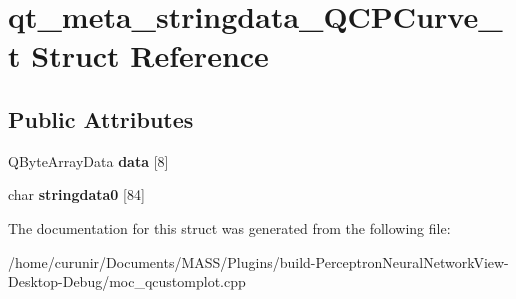 \hypertarget{structqt__meta__stringdata___q_c_p_curve__t}{}\section{qt\+\_\+meta\+\_\+stringdata\+\_\+\+Q\+C\+P\+Curve\+\_\+t Struct Reference}
\label{structqt__meta__stringdata___q_c_p_curve__t}
\subsection*{Public Attributes}
\begin{DoxyCompactItemize}
\item 
Q\+Byte\+Array\+Data {\bfseries data} \mbox{[}8\mbox{]}\hypertarget{structqt__meta__stringdata___q_c_p_curve__t_a7398cd60d68a5b116f4a9337e17df11d}{}\label{structqt__meta__stringdata___q_c_p_curve__t_a7398cd60d68a5b116f4a9337e17df11d}

\item 
char {\bfseries stringdata0} \mbox{[}84\mbox{]}\hypertarget{structqt__meta__stringdata___q_c_p_curve__t_a48e3deecb80ff42a459075e2246e712f}{}\label{structqt__meta__stringdata___q_c_p_curve__t_a48e3deecb80ff42a459075e2246e712f}

\end{DoxyCompactItemize}


The documentation for this struct was generated from the following file\+:\begin{DoxyCompactItemize}
\item 
/home/curunir/\+Documents/\+M\+A\+S\+S/\+Plugins/build-\/\+Perceptron\+Neural\+Network\+View-\/\+Desktop-\/\+Debug/moc\+\_\+qcustomplot.\+cpp\end{DoxyCompactItemize}
